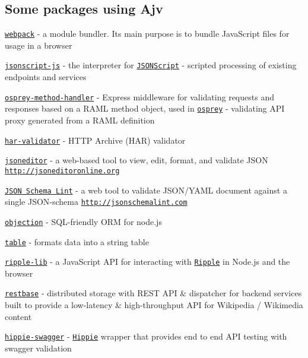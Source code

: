 \subsection*{Some packages using Ajv}


\begin{DoxyItemize}
\item \href{https://github.com/webpack/webpack}{\tt webpack} -\/ a module bundler. Its main purpose is to bundle Java\+Script files for usage in a browser
\item \href{https://github.com/JSONScript/jsonscript-js}{\tt jsonscript-\/js} -\/ the interpreter for \href{http://www.jsonscript.org}{\tt J\+S\+O\+N\+Script} -\/ scripted processing of existing endpoints and services
\item \href{https://github.com/mulesoft-labs/osprey-method-handler}{\tt osprey-\/method-\/handler} -\/ Express middleware for validating requests and responses based on a R\+A\+ML method object, used in \href{https://github.com/mulesoft/osprey}{\tt osprey} -\/ validating A\+PI proxy generated from a R\+A\+ML definition
\item \href{https://github.com/ahmadnassri/har-validator}{\tt har-\/validator} -\/ H\+T\+TP Archive (H\+AR) validator
\item \href{https://github.com/josdejong/jsoneditor}{\tt jsoneditor} -\/ a web-\/based tool to view, edit, format, and validate J\+S\+ON \href{http://jsoneditoronline.org}{\tt http\+://jsoneditoronline.\+org}
\item \href{https://github.com/nickcmaynard/jsonschemalint}{\tt J\+S\+ON Schema Lint} -\/ a web tool to validate J\+S\+O\+N/\+Y\+A\+ML document against a single J\+S\+O\+N-\/schema \href{http://jsonschemalint.com}{\tt http\+://jsonschemalint.\+com}
\item \href{https://github.com/vincit/objection.js}{\tt objection} -\/ S\+Q\+L-\/friendly O\+RM for node.\+js
\item \href{https://github.com/gajus/table}{\tt table} -\/ formats data into a string table
\item \href{https://github.com/ripple/ripple-lib}{\tt ripple-\/lib} -\/ a Java\+Script A\+PI for interacting with \href{https://ripple.com}{\tt Ripple} in Node.\+js and the browser
\item \href{https://github.com/wikimedia/restbase}{\tt restbase} -\/ distributed storage with R\+E\+ST A\+PI \& dispatcher for backend services built to provide a low-\/latency \& high-\/throughput A\+PI for Wikipedia / Wikimedia content
\item \href{https://github.com/CacheControl/hippie-swagger}{\tt hippie-\/swagger} -\/ \href{https://github.com/vesln/hippie}{\tt Hippie} wrapper that provides end to end A\+PI testing with swagger validation

\end{DoxyItemize}
